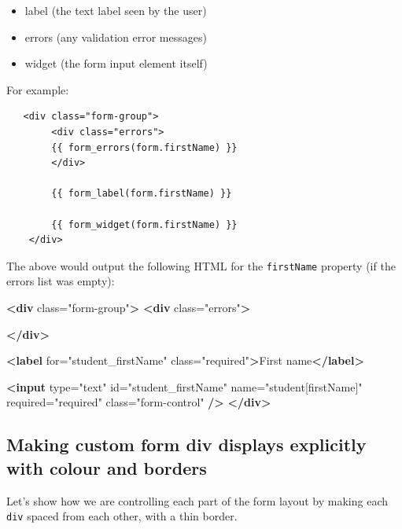 \documentclass[a4paperpaper,openright]{book}
\newenvironment{Shaded}{}{}
\newcommand{\KeywordTok}[1]{\textcolor[rgb]{0.00,0.44,0.13}{\textbf{#1}}}
\newcommand{\NormalTok}[1]{#1}
\newcommand{\OtherTok}[1]{\textcolor[rgb]{0.00,0.44,0.13}{#1}}
\newcommand{\StringTok}[1]{\textcolor[rgb]{0.25,0.44,0.63}{#1}}
\providecommand{\tightlist}{%
  \setlength{\itemsep}{0pt}\setlength{\parskip}{0pt}}
\begin{document}
\begin{itemize}
\tightlist
\item
  label (the text label seen by the user)
\item
  errors (any validation error messages)
\item
  widget (the form input element itself)
\end{itemize}

For example:

\begin{verbatim}
   <div class="form-group">
        <div class="errors">
        {{ form_errors(form.firstName) }}
        </div>

        {{ form_label(form.firstName) }}

        {{ form_widget(form.firstName) }}
    </div>
\end{verbatim}

The above would output the following HTML for the \texttt{firstName}
property (if the errors list was empty):

\begin{Shaded}
\begin{Highlighting}[]

   \KeywordTok{<div}\OtherTok{ class=}\StringTok{"form-group"}\KeywordTok{>}
    \KeywordTok{<div}\OtherTok{ class=}\StringTok{"errors"}\KeywordTok{>}
        
    \KeywordTok{</div>}

    \KeywordTok{<label}\OtherTok{ for=}\StringTok{"student_firstName"}\OtherTok{ class=}\StringTok{"required"}\KeywordTok{>}\NormalTok{First name}\KeywordTok{</label>}

    \KeywordTok{<input}\OtherTok{ type=}\StringTok{"text"}\OtherTok{ id=}\StringTok{"student_firstName"}\OtherTok{ name=}\StringTok{"student[firstName]"}\OtherTok{ required=}\StringTok{"required"}\OtherTok{ class=}\StringTok{"form-control"} \KeywordTok{/>}
    \KeywordTok{</div>}
\end{Highlighting}
\end{Shaded}

\hypertarget{making-custom-form-div-displays-explicitly-with-colour-and-borders}{%
\subsection{Making custom form div displays explicitly with colour and
borders}\label{making-custom-form-div-displays-explicitly-with-colour-and-borders}}

Let's show how we are controlling each part of the form layout by making
each \texttt{div} spaced from each other, with a thin border.
\end{document}
